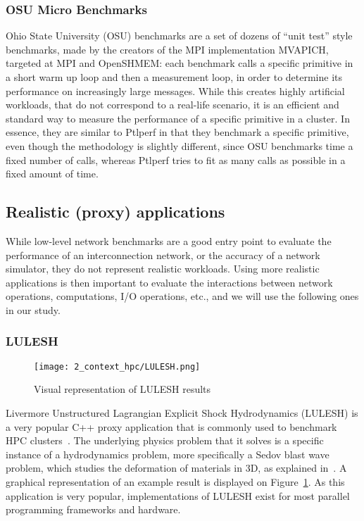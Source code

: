 \subsubsection{OSU Micro Benchmarks}

Ohio State University (OSU) benchmarks are a set of dozens of ``unit test''
style benchmarks, made by the creators of the MPI implementation MVAPICH,
targeted at MPI and OpenSHMEM: each benchmark calls a specific primitive in a
short warm up loop and then a measurement loop, in order to determine its
performance on increasingly large messages. While this creates highly artificial
workloads, that do not correspond to a real-life scenario, it is an efficient
and standard way to measure the performance of a specific primitive in a
cluster. In essence, they are similar to Ptlperf in that they benchmark a
specific primitive, even though the methodology is slightly different, since OSU
benchmarks time a fixed number of calls, whereas Ptlperf tries to fit as many
calls as possible in a fixed amount of time.

\subsection{Realistic (proxy) applications}

While low-level network benchmarks are a good entry point to evaluate the
performance of an interconnection network, or the accuracy of a network
simulator, they do not represent realistic workloads. Using more realistic
applications is then important to evaluate the interactions between network
operations, computations, I/O operations, etc., and we will use the following
ones in our study.

\subsubsection{LULESH}
\label{subsubsec:2_context_hpc:LULESH}

\begin{figure}[!ht]
    \centering
    \texttt{[image: 2\_context\_hpc/LULESH.png]}
    \caption[Visual representation of LULESH results]{Visual representation of LULESH results\protect\footnotemark}
    \label{fig:2_context_hpc:LULESH}
\end{figure}


Livermore Unstructured Lagrangian Explicit Shock Hydrodynamics (LULESH) is a
very popular C++ proxy application that is commonly used to benchmark HPC
clusters~\cite{Karlin2013}. The underlying physics problem that it solves is a
specific instance of a hydrodynamics problem, more specifically a Sedov blast
wave problem, which studies the deformation of materials in 3D, as explained
in~\cite{Hornung2011}. A graphical representation of an example result is
displayed on Figure~\ref{fig:2_context_hpc:LULESH}. As this application is very
popular, implementations of LULESH exist for most parallel programming
frameworks and hardware.

